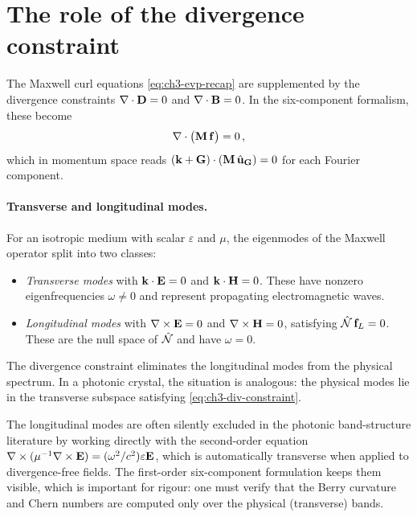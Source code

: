 \section{The role of the divergence constraint}
\label{sec:ch3-divergence}

The Maxwell curl equations \eqref{eq:ch3-evp-recap} are supplemented by
the divergence constraints $\nabla\cdot\mathbf{D}=0$ and
$\nabla\cdot\mathbf{B}=0$.  In the six-component formalism, these become
\begin{equation}\label{eq:ch3-div-constraint}
  \nabla\cdot\bigl(\mathbf{M}\,\mathbf{f}\bigr) = 0\,,
\end{equation}
which in momentum space reads $(\mathbf{k}+\mathbf{G})\cdot(\mathbf{M}\,\hat{\mathbf{u}}_{\mathbf{G}})=0$
for each Fourier component.

\paragraph{Transverse and longitudinal modes.}
For an isotropic medium with scalar $\varepsilon$ and $\mu$, the
eigenmodes of the Maxwell operator split into two classes:
\begin{itemize}
  \item \emph{Transverse modes} with $\mathbf{k}\cdot\mathbf{E}=0$ and
    $\mathbf{k}\cdot\mathbf{H}=0$.  These have nonzero eigenfrequencies
    $\omega\neq0$ and represent propagating electromagnetic waves.
  \item \emph{Longitudinal modes} with $\nabla\times\mathbf{E}=0$ and
    $\nabla\times\mathbf{H}=0$, satisfying
    $\hat{\mathcal{N}}\,\mathbf{f}_L=0$.  These are the null space of $\hat{\mathcal{N}}$
    and have $\omega=0$.
\end{itemize}
The divergence constraint eliminates the longitudinal modes from the
physical spectrum.  In a photonic crystal, the situation is analogous:
the physical modes lie in the transverse subspace satisfying
\eqref{eq:ch3-div-constraint}.

\begin{remark}
The longitudinal modes are often silently excluded in the photonic
band-structure literature by working directly with the second-order
equation $\nabla\times(\mu^{-1}\nabla\times\mathbf{E})
=(\omega^2/c^2)\varepsilon\mathbf{E}$, which is automatically transverse
when applied to divergence-free fields.  The first-order six-component
formulation keeps them visible, which is important for rigour:
one must verify that the Berry curvature and Chern numbers are computed
only over the physical (transverse) bands.
\end{remark}

